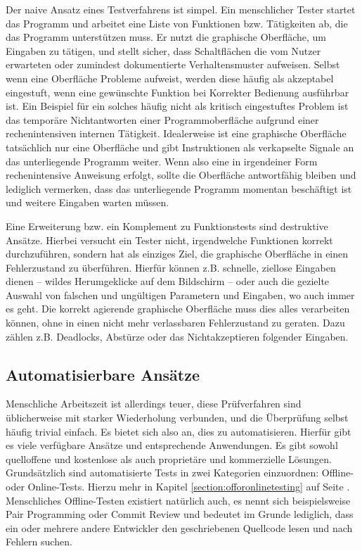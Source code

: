 Der naive Ansatz eines Testverfahrens ist simpel. Ein menschlicher Tester startet
das Programm und arbeitet eine Liste von Funktionen bzw. Tätigkeiten ab, die das
Programm unterstützen muss. Er nutzt die graphische Oberfläche, um Eingaben zu tätigen,
und stellt sicher, dass Schaltflächen die vom Nutzer erwarteten oder zumindest
dokumentierte Verhaltensmuster aufweisen. Selbst wenn eine Oberfläche Probleme aufweist,
werden diese häufig als akzeptabel eingestuft, wenn eine gewünschte Funktion
bei Korrekter Bedienung ausführbar ist. Ein Beispiel für ein solches häufig nicht als kritisch 
eingestuftes Problem ist das temporäre Nichtantworten einer Programmoberfläche
aufgrund einer rechenintensiven internen Tätigkeit. Idealerweise ist eine
graphische Oberfläche tatsächlich nur eine Oberfläche und gibt Instruktionen als
verkapselte Signale an das unterliegende Programm weiter. Wenn also eine
in irgendeiner Form rechenintensive Anweisung erfolgt, sollte die Oberfläche
antwortfähig bleiben und lediglich vermerken, dass das unterliegende Programm
momentan beschäftigt ist und weitere Eingaben warten müssen.

Eine Erweiterung bzw. ein Komplement zu Funktionstests sind destruktive Ansätze.
Hierbei versucht ein Tester nicht, irgendwelche Funktionen korrekt durchzuführen,
sondern hat als einziges Ziel, die graphische Oberfläche in einen Fehlerzustand
zu überführen. Hierfür können z.B. schnelle, ziellose Eingaben dienen -- wildes Herumgeklicke
auf dem Bildschirm -- oder auch die gezielte Auswahl von falschen und ungültigen
Parametern und Eingaben, wo auch immer es geht. Die korrekt agierende
graphische Oberfläche muss dies alles verarbeiten können, ohne in einen nicht
mehr verlassbaren Fehlerzustand zu geraten. Dazu zählen z.B. Deadlocks,
Abstürze oder das Nichtakzeptieren folgender Eingaben.

\subsection{Automatisierbare Ansätze}

Menschliche Arbeitszeit ist allerdings teuer, diese Prüfverfahren sind üblicherweise
mit starker Wiederholung verbunden, und die Überprüfung selbst häufig trivial einfach.
Es bietet sich also an, dies zu automatisieren. Hierfür gibt es viele verfügbare Ansätze
und entsprechende Anwendungen. Es gibt sowohl quelloffene und kostenlose als auch proprietäre
und kommerzielle Lösungen. Grundsätzlich sind automatisierte Tests in zwei Kategorien einzuordnen:
Offline- oder Online-Tests. Hierzu mehr in Kapitel \ref{section:offoronlinetesting} auf Seite
\pageref{section:offoronlinetesting}. Menschliches Offline-Testen existiert natürlich auch,
es nennt sich beispielsweise \glqq{}Pair Programming\grqq{} oder \glqq{}Commit Review\grqq{}
und bedeutet im Grunde lediglich, dass ein oder mehrere andere Entwickler den geschriebenen Quellcode
lesen und nach Fehlern suchen.

